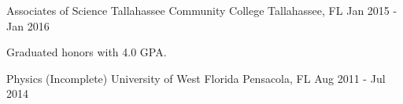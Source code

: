 

\begin{cventries}

  \cventry
    {Associates of Science} %
    {Tallahassee Community College} %
    {Tallahassee, FL} %
    {Jan 2015 - Jan 2016} %
    {
      \begin{cvitems} %
        \item {Graduated honors with 4.0 GPA.}
      \end{cvitems}
    }

  \cventry
    {Physics (Incomplete)} %
    {University of West Florida} %
    {Pensacola, FL} %
    {Aug 2011 - Jul 2014} %
    {
      \begin{cvitems} %
      \end{cvitems}
    }

\end{cventries}
